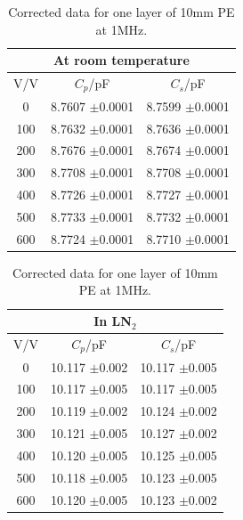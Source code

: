 \documentclass[a4paper,11pt]{article}
\begin{document}
	
\begin{table}[htbp]
\label{t:polyRTc}
\begin{center}
	\caption{Corrected data for one layer of 10mm PE at 1MHz.}
\begin{tabular}{| c | c | c |}
	\hline
	\multicolumn{3}{|c|}{At room temperature}\\
	\hline
		V/V & $C_{p}$/pF & $C_{s}$/pF\\ \hline
		
		0 & 8.7607 $\pm$0.0001 & 8.7599 $\pm$0.0001\\ \hline
		100 & 8.7632 $\pm$0.0001 & 8.7636 $\pm$0.0001\\ \hline
		200 & 8.7676 $\pm$0.0001 & 8.7674 $\pm$0.0001\\ \hline
		300 & 8.7708 $\pm$0.0001 & 8.7708 $\pm$0.0001\\ \hline
		400 & 8.7726 $\pm$0.0001 & 8.7727 $\pm$0.0001\\ \hline
		500 & 8.7733 $\pm$0.0001 & 8.7732 $\pm$0.0001\\ \hline
		600 & 8.7724 $\pm$0.0001 & 8.7710 $\pm$0.0001\\
	\hline
\end{tabular}
\hfill
\begin{tabular}{| c | c | c |}
	\hline
	\multicolumn{3}{|c|}{In LN$_{2}$}\\
	\hline
		V/V & $C_{p}$/pF & $C_{s}$/pF\\ \hline

		0 & 10.117 $\pm$0.002 & 10.117 $\pm$0.005\\ \hline
		100 & 10.117 $\pm$0.005 & 10.117 $\pm$0.005\\ \hline
		200 & 10.119 $\pm$0.002 & 10.124 $\pm$0.002\\ \hline
		300 & 10.121 $\pm$0.005 & 10.127 $\pm$0.002\\ \hline
		400 & 10.120 $\pm$0.005 & 10.125 $\pm$0.005\\ \hline
		500 & 10.118 $\pm$0.005 & 10.123 $\pm$0.005\\ \hline
		600 & 10.120 $\pm$0.005 & 10.123 $\pm$0.002\\
	\hline
\end{tabular}

\end{center}	
\end{table}
\end{document}
